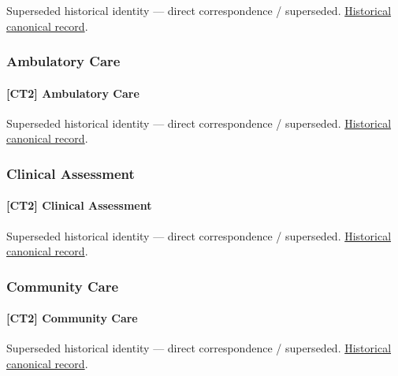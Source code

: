 \par\label{element:6cd45c27d0c344b9807174dbd812d572}
Superseded historical identity — direct correspondence / superseded. \href{../../../../continuum/strategy/capability/6cd45c27d0c344b9807174dbd812d572.md}{Historical canonical record}.\par

\subsubsection{Ambulatory Care}

\paragraph{[CT2] Ambulatory Care}

\par\label{element:e996b61b6e7b4619913f427aed2b55b1}
Superseded historical identity — direct correspondence / superseded. \href{../../../../continuum/strategy/capability/e996b61b6e7b4619913f427aed2b55b1.md}{Historical canonical record}.\par

\subsubsection{Clinical Assessment}

\paragraph{[CT2] Clinical Assessment}

\par\label{element:1c3b553c87704e27ba211fbbd02d95cb}
Superseded historical identity — direct correspondence / superseded. \href{../../../../continuum/strategy/capability/1c3b553c87704e27ba211fbbd02d95cb.md}{Historical canonical record}.\par

\subsubsection{Community Care}

\paragraph{[CT2] Community Care}

\par\label{element:4b7177f3f40449518fba381acae6ba1e}
Superseded historical identity — direct correspondence / superseded. \href{../../../../continuum/strategy/capability/4b7177f3f40449518fba381acae6ba1e.md}{Historical canonical record}.\par

